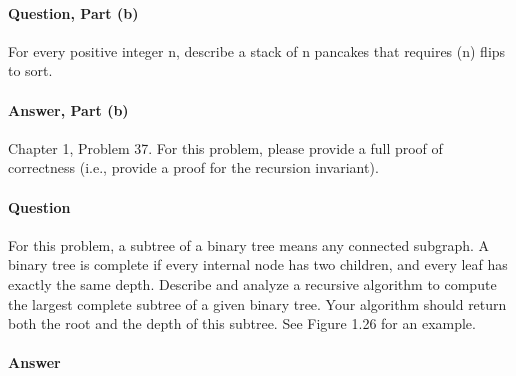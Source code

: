 \documentclass{article}
\begin{document}
\paragraph{Question, Part (b)}{For every positive integer n, describe a stack of n pancakes that requires (n) flips to sort.}
\paragraph{Answer, Part (b)}

\todo{}

\collab{\todo{}}

Chapter 1, Problem 37.  For this problem, please provide a full proof of
correctness (i.e., provide a proof for the recursion invariant).

\paragraph{Question}{For this problem, a subtree of a binary tree means any connected subgraph.
A binary tree is complete if every internal node has two children, and every
leaf has exactly the same depth. Describe and analyze a recursive algorithm
to compute the largest complete subtree of a given binary tree. Your algorithm
should return both the root and the depth of this subtree. See Figure 1.26
for an example.}

\paragraph{Answer}
\todo{}
\end{document}
